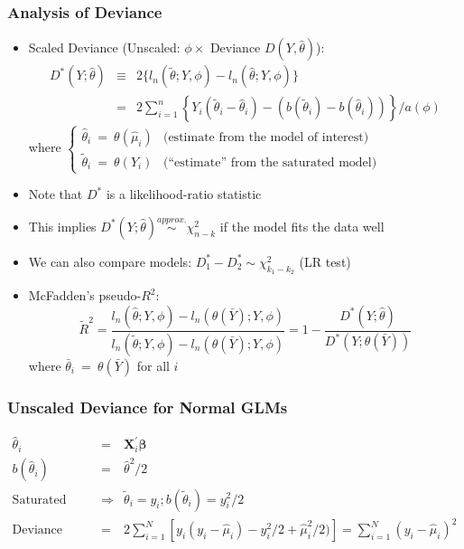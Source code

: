 \documentclass{beamer}
\begin{document}
\begin{frame}
  \frametitle{Analysis of Deviance}
\begin{itemize}
   \item \alert{Scaled Deviance} (Unscaled: $\phi \times $ Deviance $D(Y, \hat{\theta})$):
     \begin{eqnarray*}
     D^\ast(Y; \hat\theta) & \equiv & 2 \{l_n(\tilde\theta;Y,\phi) - l_n(\hat\theta;Y,\phi)\} \\
      & = & 2\sum_{i=1}^n
      \left\{Y_i(\tilde\theta_i - \hat\theta_i) - (b(\tilde\theta_i) - b(\hat\theta_i)) \right\}\big/a(\phi)
      \end{eqnarray*}
{\small
     where $\left\{ \begin{array}{ll}
        \hat\theta_i \ = \ \theta(\hat\mu_i) & \text{(estimate from the model of interest)} \\
      \tilde\theta_i \ = \ \theta(Y_i) & \text{(``estimate'' from the saturated model)}
        \end{array} \right.$
}
\pause
\medskip
    \item Note that $D^\ast$ is a likelihood-ratio statistic
    \item This implies $D^\ast(Y; \hat\theta) \stackrel{approx.}{\sim} \chi^2_{n-k}$
      if the model fits the data well
\pause
    \item We can also compare models: $D^\ast_1 - D^\ast_2 \sim \chi^2_{k_1 - k_2}$ (LR test)
\medskip
\pause
    \item McFadden's \alert{pseudo-$R^2$}:
      $$\tilde R^2 = \frac{l_n(\hat\theta; Y,\phi) - l_n(\theta(\bar Y); Y,\phi)}
                    {l_n(\tilde\theta; Y,\phi) - l_n(\theta(\bar Y); Y,\phi)}
             = 1 - \frac{D^\ast(Y; \hat\theta)}{D^\ast(Y; \theta(\bar Y))} $$
where $\bar\theta_i \ = \ \theta(\bar Y)$ for all $i$
  \end{itemize}
\end{frame}


\begin{frame}
\frametitle{Unscaled Deviance for Normal GLMs}

\begin{eqnarray}
\hat{\theta}_{i} & = & \boldsymbol{X}_{i}^{'} \boldsymbol{\beta} \nonumber \\
b(\hat{\theta}_{i}) & = & \hat{\theta}^2/2 \nonumber \\
\text{Saturated model} & \Rightarrow & \tilde{\theta}_{i} = y_{i} ; b(\tilde{\theta}_{i}) = y_{i}^2/2 \nonumber \\
\text{Deviance} & = & 2 \sum_{i=1}^{N}\left[y_{i}(y_{i} - \hat{\mu}_{i}) - y_{i}^2/2 + \hat{\mu}_{i}^2/2)   \right] = \sum_{i=1}^{N} (y_{i} - \hat{\mu}_{i})^2 \nonumber
\end{eqnarray}




\end{frame}
\end{document}
